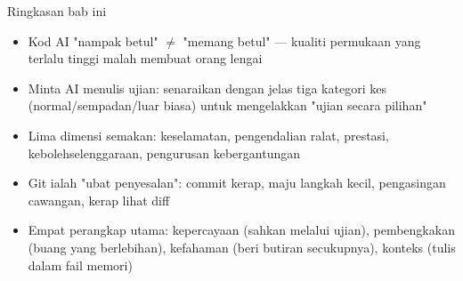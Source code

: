 \begin{tcbsummary}{Ringkasan bab ini}
\begin{itemize}
  \item Kod AI "nampak betul" $\neq$ "memang betul" — kualiti permukaan yang terlalu tinggi malah membuat orang lengai
  \item Minta AI menulis ujian: senaraikan dengan jelas tiga kategori kes (normal/sempadan/luar biasa) untuk mengelakkan "ujian secara pilihan"
  \item Lima dimensi semakan: keselamatan, pengendalian ralat, prestasi, kebolehselenggaraan, pengurusan kebergantungan
  \item Git ialah "ubat penyesalan": commit kerap, maju langkah kecil, pengasingan cawangan, kerap lihat diff
  \item Empat perangkap utama: kepercayaan (sahkan melalui ujian), pembengkakan (buang yang berlebihan), kefahaman (beri butiran secukupnya), konteks (tulis dalam fail memori)
\end{itemize}

\end{tcbsummary}

